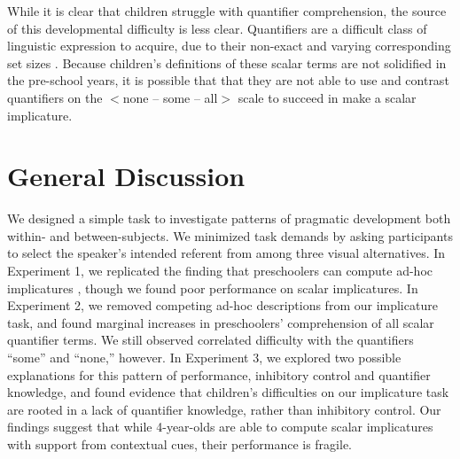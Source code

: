 \documentclass[man]{apa2}
\begin{document}
{While it is clear that children struggle with quantifier comprehension, the source of this developmental difficulty is less clear. Quantifiers are a difficult class of linguistic expression to acquire, due to their non-exact and varying corresponding set sizes \cite{hurewitz2006}. Because children's definitions of these scalar terms are not solidified in the pre-school years, it is possible that that they are not able to use and contrast quantifiers on the $<${\sc none -- some -- all}$>$ scale to succeed in make a scalar implicature.

\section{General Discussion}

We designed a simple task to investigate patterns of pragmatic development both within- and between-subjects. We minimized task demands by asking participants to select the speaker's intended referent from among three visual alternatives. In Experiment 1, we replicated the finding that preschoolers can compute ad-hoc implicatures \cite{stiller2014}, though we found poor performance on scalar implicatures. In Experiment 2, we removed competing ad-hoc descriptions from our implicature task, and found marginal increases in preschoolers' comprehension of all scalar quantifier terms. We still observed correlated difficulty with the quantifiers ``some'' and ``none,'' however. In Experiment 3, we explored two possible explanations for this pattern of performance, inhibitory control and quantifier knowledge, and found evidence that children's difficulties on our implicature task are rooted in a lack of quantifier knowledge, rather than inhibitory control. Our findings suggest that while 4-year-olds are able to compute scalar implicatures with support from contextual cues, their performance is fragile.

}
\end{document}
